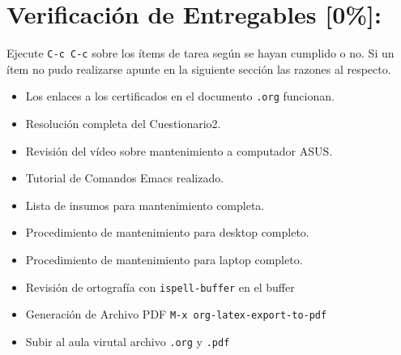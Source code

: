 \documentclass{article}
\begin{document}
\section{Verificación de Entregables [0\%]:}
\label{sec:orgc8792ed}
Ejecute \texttt{C-c C-c} sobre los ítems de tarea según se hayan cumplido o
no. Si un ítem no pudo realizarse apunte en la siguiente sección las
razones al respecto.
\begin{itemize}
\item[{$\square$}] Los enlaces a los certificados en el documento \texttt{.org} funcionan.
\item[{$\square$}] Resolución completa del Cuestionario2.
\item[{$\square$}] Revisión del vídeo sobre mantenimiento a computador ASUS.
\item[{$\square$}] Tutorial de Comandos Emacs realizado.
\item[{$\square$}] Lista de insumos para mantenimiento completa.
\item[{$\square$}] Procedimiento de mantenimiento para desktop completo.
\item[{$\square$}] Procedimiento de mantenimiento para laptop completo.
\item[{$\square$}] Revisión de ortografía con \texttt{ispell-buffer} en el buffer
\item[{$\square$}] Generación de Archivo PDF \texttt{M-x org-latex-export-to-pdf}
\item[{$\square$}] Subir al aula virutal archivo \texttt{.org} y \texttt{.pdf}
\end{itemize}

\printbibliography
\end{document}
